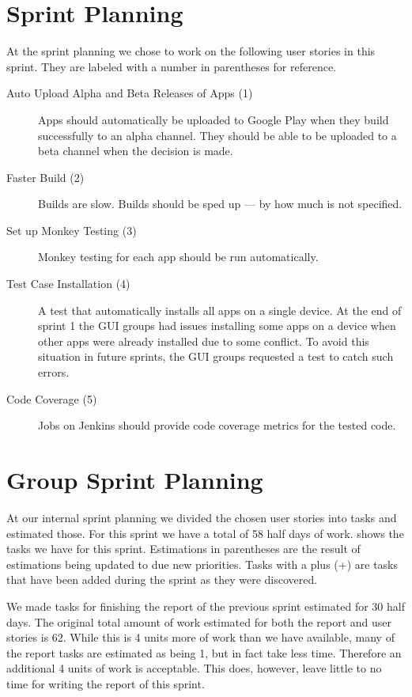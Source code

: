 \section{\bdtitle Sprint Planning}\label{sec:S2_bd}
At the \bd sprint planning we chose to work on the following user stories in this sprint. They are labeled with a number in parentheses for reference.

\begin{description}
  \item[Auto Upload Alpha and Beta Releases of Apps (1)] Apps should automatically be uploaded to Google Play when they build successfully to an alpha channel. They should be able to be uploaded to a beta channel when the decision is made.
  \item[Faster Build (2)] Builds are slow. Builds should be sped up --- by how much is not specified.
  \item[Set up Monkey Testing (3)] Monkey testing for each app should be run automatically.
  \item[Test Case Installation (4)] A test that automatically installs all apps on a single device. At the end of sprint 1 the GUI groups had issues installing some apps on a device when other apps were already installed due to some conflict. To avoid this situation in future sprints, the GUI groups requested a test to catch such errors.
  \item[Code Coverage (5)] Jobs on Jenkins should provide code coverage metrics for the tested code.
\end{description}

\section{Group Sprint Planning}\label{sec:S2_group}
At our internal sprint planning we divided the chosen user stories into tasks and estimated those. For this sprint we have a total of 58 half days of work.  shows the tasks we have for this sprint. Estimations in parentheses are the result of estimations being updated to due new priorities. Tasks with a plus (+) are tasks that have been added during the sprint as they were discovered.

We made tasks for finishing the report of the previous sprint estimated for 30 half days. The original total amount of work estimated for both the report and user stories is 62. While this is 4 units more of work than we have available, many of the report tasks are estimated as being 1, but in fact take less time. Therefore an additional 4 units of work is acceptable. This does, however, leave little to no time for writing the report of this sprint.

